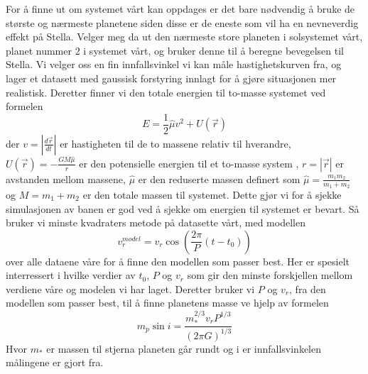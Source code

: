 \documentclass[11pt, A4paper, norsk]{report}
\begin{document}
For å finne ut om systemet vårt kan oppdages er det bare nødvendig å bruke de største og nærmeste planetene siden disse er de eneste som vil ha en nevneverdig effekt på Stella. Velger meg da ut den nærmeste store planeten i solsystemet vårt, planet nummer $2$ i systemet vårt, og bruker denne til å beregne bevegelsen til Stella. Vi velger oss en fin innfallsvinkel vi kan måle hastighetskurven fra, og lager et datasett med gaussisk forstyring innlagt for å gjøre situasjonen mer realistisk. Deretter finner vi den totale energien til to-masse systemet ved formelen \cite{Two-body problem} $$E = \frac{1}{2} \hat{\mu} v^2 + U(\vec{r})$$ der $v = \left|\frac{d\vec{r}}{dt}\right|$ er hastigheten til de to massene relativ til hverandre, $U(\vec{r}) = - \frac{GM \hat{\mu}}{r}$ er den potensielle energien til et to-masse system \cite{SoftSchools}, $r = |\vec{r}|$ er avstanden mellom massene, $\hat{\mu}$ er den reduserte massen definert som $\hat{\mu} = \frac{m_1 m_2}{m_1 + m_2}$ og $M = m_1 + m_2$ er den totale massen til systemet. Dette gjør vi for å sjekke simulasjonen av banen er god ved å sjekke om energien til systemet er bevart. Så bruker vi minste kvadraters metode på datasette vårt, med modellen \cite{1C} $$v_r^{model} = v_r \cos\left(\frac{2 \pi}{P}(t - t_0) \right)$$  over alle dataene våre for å finne den modellen som passer best. Her er spesielt interressert i hvilke verdier av $t_0$, $P$ og $v_r$ som gir den minste forskjellen mellom verdiene våre og modelen vi har laget. Deretter bruker vi $P$ og $v_r$, fra den modellen som passer best, til å finne planetens masse ve hjelp av formelen \cite{1C} $$m_p \sin i = \frac{m_{*}^{2/3}v_{r}P^{1/3}}{(2 \pi G)^{1/3}}$$ Hvor $m_{*}$ er massen til stjerna planeten går rundt og i er innfallsvinkelen målingene er gjort fra.
\end{document}
